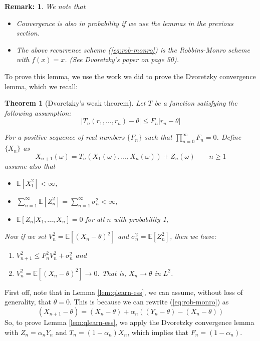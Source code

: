 \documentclass{article}
\def\E{\mathbb{E}}
\newtheorem{theorem}{Theorem}
\newtheorem*{remark}{Remark:}
\begin{document}
\begin{remark}
We note that
\begin{itemize}
    \item Convergence is also in probability if we use the lemmas in the previous section.
    \item The above recurrence scheme (\ref{eq:rob-monro}) is the Robbins-Monro scheme with $f(x) = x$. (See Dvoretzky's paper on page 50).
\end{itemize} 
\end{remark}

To prove this lemma, we use the work we did to prove the Dvoretzky convergence lemma, which we recall:

\begin{theorem}[Dvoretzky's weak theorem]
Let $T$ be a function satisfying the following assumption:
\begin{equation}\label{eq:dvoret}
|T_n(r_1,\dots,r_n) - \theta| \le F_n | r_n - \theta |    
\end{equation}

For a positive sequence of real numbers $\{F_n\}$ such that $\prod_{n=0}^\infty F_n =0$.
Define $\{X_n\}$ as
\[
X_{n+1}(\omega) = T_n(X_1(\omega),\dots,X_n(\omega)) + Z_n(\omega) \qquad n \ge 1 
\]
assume also that
\begin{itemize}
    \item $\mathbb{E}[X_1^2] < \infty$,
    \item $\sum_{n=1}^{\infty}\E[Z_n^2] = \sum_{n=1}^{\infty}\sigma_n^2 < \infty$,
    \item $\E[Z_n | X_1,\dots,X_n] = 0$ for all $n$ with probability 1,
\end{itemize}

Now if we set $V_n^2 = \E\left[ (X_n - \theta)^2\right]$ and $\sigma_n^2 = \E\left[ Z_n^2 \right]$, then we have:
\begin{enumerate}
    \item $V_{n+1}^2 \le F_n^2 V_n^2 + \sigma_n^2$ and
    \item $V_n^2 = \E\left[ (X_n - \theta)^2\right] \to 0$. That is, $X_n \to \theta$ in $L^2$.
\end{enumerate} 

\end{theorem}

First off, note that in Lemma \ref{lem:qlearn-ess}, we can assume, without loss of generality, that $\theta = 0$. 
This is because we can rewrite (\ref{eq:rob-monro}) as 
\[ 
    (X_{n+1} - \theta)= (X_n - \theta) + \alpha_n ((Y_n-\theta) - (X_n-\theta))    
\] 
So, to prove Lemma \ref{lem:qlearn-ess}, we apply the Dvoretzky convergence lemma with $Z_n = \alpha_n Y_n$ and $T_n = (1 - \alpha_n)X_n$, which implies that $F_n = (1 - \alpha_n)$. 
\end{document}

